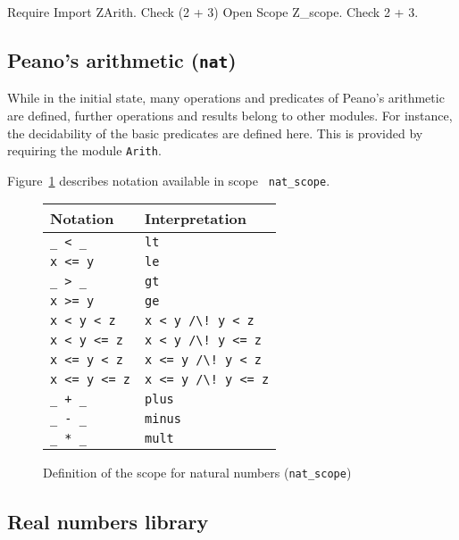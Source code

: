 \begin{coq_example}
Require Import ZArith.
Check  (2 + 3)%
Open Scope Z_scope.
Check 2 + 3.
\end{coq_example}

\subsection[Peano's arithmetic (\texttt{nat})]{Peano's arithmetic (\texttt{nat})
}

While in the initial state, many operations and predicates of Peano's
arithmetic are defined, further operations and results belong to other
modules. For instance, the decidability of the basic predicates are
defined here. This is provided by requiring the module {\tt Arith}.

Figure~\ref{nat-syntax} describes notation available in scope {\tt
nat\_scope}.

\begin{figure}
\begin{center}
\begin{tabular}{l|l}
Notation & Interpretation \\
\hline
\verb!_ < _! & {\tt lt} \\
\verb!x <= y! & {\tt le} \\
\verb!_ > _! & {\tt gt} \\
\verb!x >= y! & {\tt ge} \\
\verb!x < y < z! & {\tt x < y \verb!/\! y < z} \\
\verb!x < y <= z! & {\tt x < y \verb!/\! y <= z} \\
\verb!x <= y < z! & {\tt x <= y \verb!/\! y < z} \\
\verb!x <= y <= z! & {\tt x <= y \verb!/\! y <= z} \\
\verb!_ + _! & {\tt plus} \\
\verb!_ - _! & {\tt minus} \\
\verb!_ * _! & {\tt mult} \\
\end{tabular}
\end{center}
\caption{Definition of the scope for natural numbers ({\tt nat\_scope})}
\label{nat-syntax}
\end{figure}

\subsection{Real numbers library}

